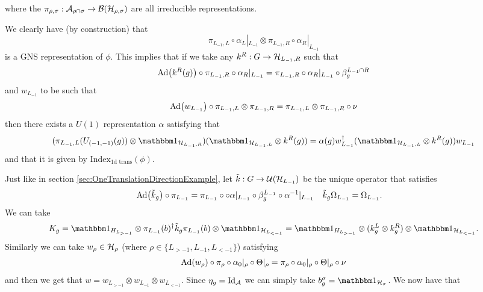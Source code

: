 \documentclass[11pt,a4paper,twoside]{article}
\numberwithin{equation}{section}
\begin{document}
where the $\pi_{\rho,\sigma}:\AA_{\rho\cap\sigma}\rightarrow\BB(\HH_{\rho,\sigma})$ are all irreducible representations.
\begin{remark}\label{rem:GNS_One_DimensionalTwoTranslations}
	We clearly have (by construction) that
	\begin{equation}
		\pi_{L_{-1},L}\circ\alpha_L|_{L_{-1}}\otimes \pi_{L_{-1},R}\circ\alpha_R|_{L_{-1}}
	\end{equation}
	is a GNS representation of $\phi$. This implies that if we take any $k^R:G\rightarrow \HH_{L_{-1},R}$ such that
	\begin{equation}
		\Ad{k^R(g)}\circ\pi_{L_{-1},R}\circ\alpha_R|_{L_{-1}}=\pi_{L_{-1},R}\circ\alpha_R|_{L_{-1}}\circ\beta_{g}^{L_{-1}\cap R}
	\end{equation}
	and $w_{L_{-1}}$ to be such that
	\begin{equation}
		\Ad{w_{L_{-1}}}\circ\pi_{L_{-1},L}\otimes \pi_{L_{-1},R}=\pi_{L_{-1},L}\otimes \pi_{L_{-1},R}\circ\nu
	\end{equation}
	then there exists a $U(1)$ representation $\alpha$ satisfying that
	\begin{equation}
		(\pi_{L_{-1},L}(U_{(-1,-1)}(g))\otimes \id_{\HH_{L_{-1},R}}) (\id_{\HH_{L_{-1},L}}\otimes k^R(g))=\alpha(g) w_{L_{-1}}^\dagger(\id_{\HH_{L_{-1},L}}\otimes k^R(g))w_{L_{-1}}
	\end{equation}
	and that it is given by $\textrm{Index}_{\text{1d trans}}(\phi)$.
\end{remark}
Just like in section \ref{sec:OneTranslationDirectionExample}, let $\tilde k:G\rightarrow \UU(\HH_{L_{-1}})$ be the unique operator that satisfies
\begin{align}
	\Ad{\tilde{k}_g}\circ\pi_{L_{-1}}&=\pi_{L_{-1}}\circ \circ\alpha|_{L_{-1}}\circ\beta_g^{L_{-1}}\circ \alpha^{-1}|_{L_{-1}}&\tilde k_g\Omega_{L_{-1}}&=\Omega_{L_{-1}}.
\end{align}
We can take
\begin{equation}
	K_g=\id_{H_{L_{>-1}}}\otimes \pi_{L_{-1}}(b)^\dagger \tilde k_g \pi_{L_{-1}}(b) \otimes\id_{\HH_{L_{<-1}}} =\id_{H_{L_{>-1}}}\otimes (k_g^L\otimes k_g^R) \otimes\id_{\HH_{L_{<-1}}}.
\end{equation}
Similarly we can take $w_\rho\in\HH_\rho$ (where $\rho\in\{L_{>-1},L_{-1},L_{<-1}\}$) satisfying
\begin{equation}
	\Ad{w_\rho}\circ\pi_\rho\circ\alpha_{0}|_\rho\circ\Theta|_\rho=\pi_\rho\circ\alpha_{0}|_\rho\circ\Theta|_\rho\circ\nu
\end{equation}
and then we get that $w=w_{L_{>-1}}\otimes w_{L_{-1}}\otimes w_{L_{<-1}}$. Since $\eta_g=\textrm{Id}_{\AA}$ we can simply take $b_g^\sigma=\id_{\HH_\sigma}$. We now have that
\end{document}
